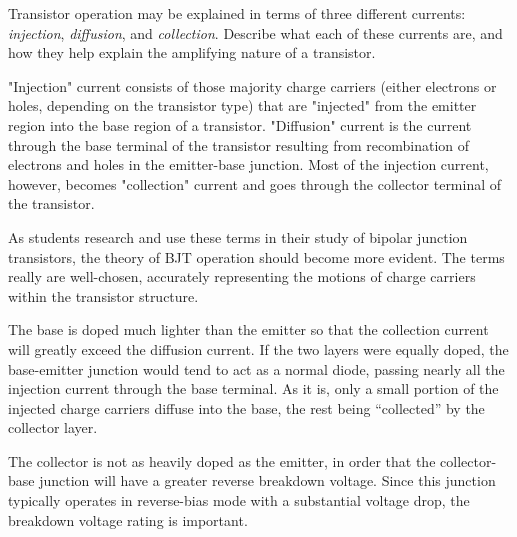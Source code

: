 

Transistor operation may be explained in terms of three different currents: {\it injection}, {\it diffusion}, and {\it collection}.  Describe what each of these currents are, and how they help explain the amplifying nature of a transistor.







"Injection" current consists of those majority charge carriers (either electrons or holes, depending on the transistor type) that are "injected" from the emitter region into the base region of a transistor.  "Diffusion" current is the current through the base terminal of the transistor resulting from recombination of electrons and holes in the emitter-base junction.  Most of the injection current, however, becomes "collection" current and goes through the collector terminal of the transistor.







As students research and use these terms in their study of bipolar junction transistors, the theory of BJT operation should become more evident.  The terms really are well-chosen, accurately representing the motions of charge carriers within the transistor structure.

The base is doped much lighter than the emitter so that the collection current will greatly exceed the diffusion current.  If the two layers were equally doped, the base-emitter junction would tend to act as a normal diode, passing nearly all the injection current through the base terminal.  As it is, only a small portion of the injected charge carriers diffuse into the base, the rest being ``collected'' by the collector layer.

The collector is not as heavily doped as the emitter, in order that the collector-base junction will have a greater reverse breakdown voltage.  Since this junction typically operates in reverse-bias mode with a substantial voltage drop, the breakdown voltage rating is important.




